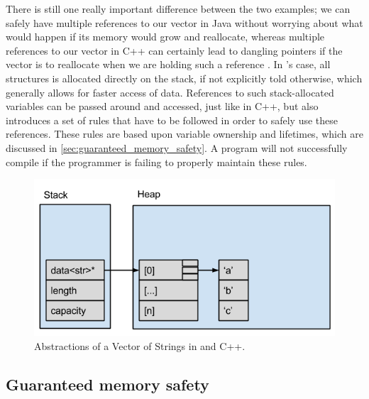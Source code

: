 There is still one really important difference between the two examples; we can safely have multiple references to our vector in Java without worrying about what would happen if its memory would grow and reallocate, whereas multiple references to our vector in C++ can certainly lead to dangling pointers if the vector is to reallocate when we are holding such a reference
.
In {\rust}'s case, all structures is allocated directly on the stack, if not explicitly told otherwise, which generally allows for faster access of data.
References to such stack-allocated variables can be passed around and accessed, just like in C++,
but {\rust} also introduces a set of rules that have to be followed in order to safely use these references.
These rules are based upon variable ownership and lifetimes, which are discussed in \autoref{sec:guaranteed_memory_safety}.
A {\rust} program will not successfully compile if the programmer is failing to properly maintain these rules.

\begin{figure}[tb]
  \begin{center}
    \includegraphics[scale=0.5]{figures/cpp_abstractions}
  \end{center}
  \caption{Abstractions of a Vector of Strings in {\rust} and C++.}
  \label{fig:cpp_abstractions}
\end{figure}

\subsection{Guaranteed memory safety}
\label{sec:guaranteed_memory_safety}

